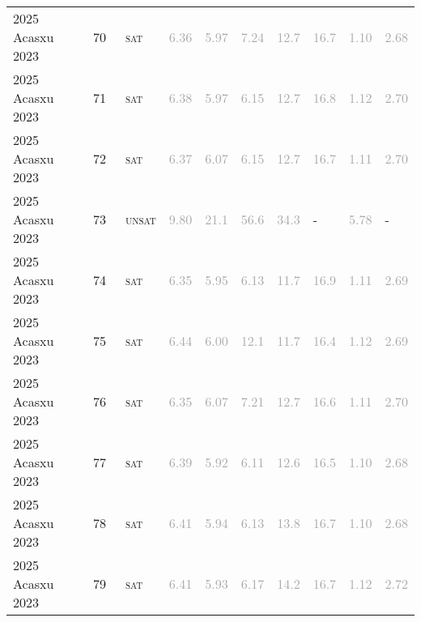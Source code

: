 \begin{center}
{\begin{longtable}{@{}llllllllll@{}}
2025 Acasxu 2023 & 70 & ~\textsc{sat} & \textcolor{darkgray}{6.36} & \textcolor{darkgray}{5.97} & \textcolor{darkgray}{7.24} & \textcolor{darkgray}{12.7} & \textcolor{darkgray}{16.7} & \textcolor{darkgray}{1.10} & \textcolor{darkgray}{2.68} \\
2025 Acasxu 2023 & 71 & ~\textsc{sat} & \textcolor{darkgray}{6.38} & \textcolor{darkgray}{5.97} & \textcolor{darkgray}{6.15} & \textcolor{darkgray}{12.7} & \textcolor{darkgray}{16.8} & \textcolor{darkgray}{1.12} & \textcolor{darkgray}{2.70} \\
2025 Acasxu 2023 & 72 & ~\textsc{sat} & \textcolor{darkgray}{6.37} & \textcolor{darkgray}{6.07} & \textcolor{darkgray}{6.15} & \textcolor{darkgray}{12.7} & \textcolor{darkgray}{16.7} & \textcolor{darkgray}{1.11} & \textcolor{darkgray}{2.70} \\
2025 Acasxu 2023 & 73 & ~\textsc{unsat} & \textcolor{darkgray}{9.80} & \textcolor{darkgray}{21.1} & \textcolor{darkgray}{56.6} & \textcolor{darkgray}{34.3} & - & \textcolor{darkgray}{5.78} & - \\
2025 Acasxu 2023 & 74 & ~\textsc{sat} & \textcolor{darkgray}{6.35} & \textcolor{darkgray}{5.95} & \textcolor{darkgray}{6.13} & \textcolor{darkgray}{11.7} & \textcolor{darkgray}{16.9} & \textcolor{darkgray}{1.11} & \textcolor{darkgray}{2.69} \\
2025 Acasxu 2023 & 75 & ~\textsc{sat} & \textcolor{darkgray}{6.44} & \textcolor{darkgray}{6.00} & \textcolor{darkgray}{12.1} & \textcolor{darkgray}{11.7} & \textcolor{darkgray}{16.4} & \textcolor{darkgray}{1.12} & \textcolor{darkgray}{2.69} \\
2025 Acasxu 2023 & 76 & ~\textsc{sat} & \textcolor{darkgray}{6.35} & \textcolor{darkgray}{6.07} & \textcolor{darkgray}{7.21} & \textcolor{darkgray}{12.7} & \textcolor{darkgray}{16.6} & \textcolor{darkgray}{1.11} & \textcolor{darkgray}{2.70} \\
2025 Acasxu 2023 & 77 & ~\textsc{sat} & \textcolor{darkgray}{6.39} & \textcolor{darkgray}{5.92} & \textcolor{darkgray}{6.11} & \textcolor{darkgray}{12.6} & \textcolor{darkgray}{16.5} & \textcolor{darkgray}{1.10} & \textcolor{darkgray}{2.68} \\
2025 Acasxu 2023 & 78 & ~\textsc{sat} & \textcolor{darkgray}{6.41} & \textcolor{darkgray}{5.94} & \textcolor{darkgray}{6.13} & \textcolor{darkgray}{13.8} & \textcolor{darkgray}{16.7} & \textcolor{darkgray}{1.10} & \textcolor{darkgray}{2.68} \\
2025 Acasxu 2023 & 79 & ~\textsc{sat} & \textcolor{darkgray}{6.41} & \textcolor{darkgray}{5.93} & \textcolor{darkgray}{6.17} & \textcolor{darkgray}{14.2} & \textcolor{darkgray}{16.7} & \textcolor{darkgray}{1.12} & \textcolor{darkgray}{2.72} \\

\end{longtable}}
\end{center}
